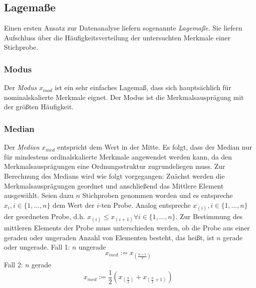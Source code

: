 \documentclass[fontsize=11pt]{scrartcl}
\begin{document}
                \subsection{Lagemaße}
                    Einen ersten Ansatz zur Datenanalyse liefern sogenannte \emph{Lagemaße}. Sie liefern Aufschluss über die Häufigkeitsverteilung der untersuchten Merkmale einer Stichprobe. \cite{kohn2005}
                    \subsubsection{Modus}
                        Der \emph{Modus} $x_{mod}$ ist ein sehr einfaches Lagemaß, dass sich hauptsächlich für nominalskalierte Merkmale eignet. Der Modus ist die Merkmalsausprägung mit der größten Häufigkeit. \cite{kohn2005}
                    \subsubsection{Median}
                        Der \emph{Median} $x_{med}$ entspricht dem Wert in der Mitte. Es folgt, dass der Median nur für mindestens ordinalskalierte Merkmale angewendet werden kann, da den Merkmalsausprägungen eine Ordnungsstruktur zugrundeliegen muss. \cite{kohn2005}
                        \newline
                        Zur Berechnung des Medians wird wie folgt vorgegangen: Zuächst werden die Merkmalsausprägungen geordnet und anschließend das Mittlere Element ausgewählt. Seien dazu $n$ Stichproben genommen worden und es entspreche $x_i,i \in \{1,\dots,n\}$ dem Wert der $i$-ten Probe. Analog entspreche $x_{(i)}, i \in \{1,\dots,n\}$ der geordneten Probe, d.h. $x_{(i)} \leq x_{(i+1)} \forall i \in \{1,\dots,n\}$.
                        \newline
                        Zur Bestimmung des mittleren Elements der Probe muss unterschieden werden, ob die Probe aus einer geraden oder ungeraden Anzahl von Elementen besteht, das heißt, ist $n$ gerade oder ungerade.
                        \newline
                        Fall 1:
                        \newline
                        $n$ ungerade
                        $$ x_{med} := x_{(\frac{n+1}{2})} $$
                        Fall 2:
                        \newline
                        $n$ gerade
                        $$ x_{med} := \frac{1}{2}\left( x_{(\frac{n}{2})} + x_{(\frac{n}{2}+1)} \right) $$
\end{document}
